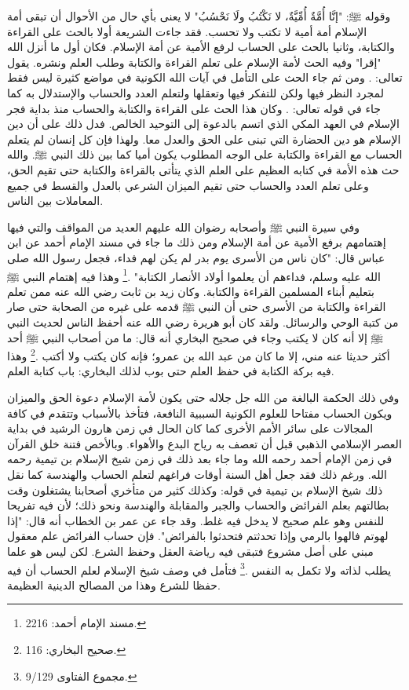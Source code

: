 وقوله ﷺ: "إنَّا أُمَّةٌ أُمِّيَّةٌ، لا نَكْتُبُ ولَا نَحْسُبُ" لا يعنى بأي حال من الأحوال أن تبقى أمة الإسلام أمة أمية لا تكتب ولا تحسب.  فقد جاءت الشريعة أولا بالحث على القراءة والكتابة، وثانيا بالحث على الحساب لرفع الأمية عن أمة الإسلام. فكان أول ما أنزل الله "إقرا" وفيه الحث لأمة الإسلام على تعلم القراءة والكتابة وطلب العلم ونشره. يقول تعالى:
\quranayah*[96][1-5]{\footnotesize \surahname*[96]}.
ومن ثم جاء الحث على التأمل في آيات الله الكونية في مواضع كثيرة ليس فقط لمجرد النظر فيها ولكن للتفكر فيها وتعقلها ولتعلم العدد والحساب والإستدلال به كما جاء في قوله تعالى: \quranayah*[10][5]{\footnotesize \surahname*[10]}. وكان هذا الحث على القراءة والكتابة والحساب منذ بداية فجر الإسلام في العهد المكي الذي اتسم بالدعوة إلى التوحيد الخالص. فدل ذلك على أن دين الإسلام هو دين الحضارة التي تبنى على الحق والعدل معا. ولهذا فإن كل إنسان لم يتعلم الحساب مع القراءة والكتابة على الوجه المطلوب يكون أميا كما بين ذلك النبي ﷺ. والله حث هذه الأمة في كتابه العظيم على العلم الذي يتأتى بالقراءة والكتابة حتى تقيم الحق، وعلى تعلم العدد والحساب حتى تقيم الميزان الشرعي بالعدل والقسط في جميع المعاملات بين الناس. 

وفي سيرة النبي ﷺ وأصحابه رضوان الله عليهم العديد من المواقف والتي فيها إهتمامهم برفع الأمية عن أمة الإسلام ومن ذلك ما جاء في مسند الإمام أحمد عن ابن عباس قال: "كان ناس من الأسرى يوم بدر لم يكن لهم فداء، فجعل رسول الله صلى الله عليه وسلم، فداءهم أن يعلموا أولاد الأنصار الكتابة" \href{https://shamela.ws/book/25794/1602#p1}{\faExternalLink} \cite{ahmid}.\footnote{مسند الإمام أحمد: 2216.}  وهذا فيه إهتمام النبي ﷺ بتعليم أبناء المسلمين القراءة والكتابة. وكان زيد بن ثابت رضي الله عنه ممن تعلم القراءة والكتابة من الأسرى حتى أن النبي ﷺ قدمه على غيره من الصحابة حتى صار من كتبة الوحي والرسائل. ولقد كان أبو هريرة رضي الله عنه أحفظ الناس لحديث النبي ﷺ إلا أنه كان لا يكتب وجاء في صحيح البخاري أنه قال: ما من أصحاب النبي ﷺ أحد أكثر حديثا عنه مني، إلا ما كان من عبد الله بن عمرو؛ فإنه كان يكتب ولا أكتب\href{https://shamela.ws/book/1284/250#p1}{\faExternalLink} \cite{ahmid}.\footnote{صحيح البخاري: 116.} وهذا فيه بركة الكتابة في حفظ العلم حتى بوب لذلك البخاري: باب كتابة العلم. 

وفي ذلك الحكمة البالغة من الله جل جلاله حتى يكون لأمة الإسلام دعوة الحق والميزان ويكون الحساب مفتاحا للعلوم الكونية السببية النافعة، فتأخذ بالأسباب وتتقدم في كافة المجالات على سائر الأمم الأخرى كما كان الحال في زمن هارون الرشيد في بداية العصر الإسلامي الذهبي قبل أن تعصف به رياح البدع والأهواء. وبالأخص فتنة خلق القرآن في زمن الإمام أحمد رحمه الله وما جاء بعد ذلك في زمن شيخ الإسلام بن تيمية رحمه الله. ورغم ذلك فقد جعل أهل السنة أوقات فراغهم لتعلم الحساب والهندسة كما نقل ذلك شيخ الإسلام بن تيمية في قوله: وكذلك كثير من متأخري أصحابنا يشتغلون وقت بطالتهم بعلم الفرائض والحساب والجبر والمقابلة والهندسة ونحو ذلك؛ لأن فيه تفريحا للنفس وهو علم صحيح لا يدخل فيه غلط. وقد جاء عن عمر بن الخطاب أنه قال: "إذا لهوتم فالهوا بالرمي وإذا تحدثتم فتحدثوا بالفرائض". فإن حساب الفرائض علم معقول مبني على أصل مشروع فتبقى فيه رياضة العقل وحفظ الشرع. لكن ليس هو علما يطلب لذاته ولا تكمل به النفس \href{https://shamela.ws/book/7289/4394#p1}{\faExternalLink} \cite{ibnTaimia_Majmoo}.\footnote{مجموع الفتاوى 9/129.} فتأمل في وصف شيخ الإسلام لعلم الحساب أن فيه حفظا للشرع وهذا من المصالح الدينية العظيمة.

